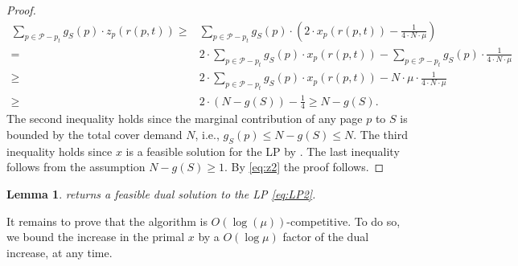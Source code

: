 \documentclass[11pt]{article}
\newcommand{\comment}[1]{}
\newcommand{\cP}{{\mathcal{P}}}
\newtheorem{lemma}[thm]{Lemma}
\begin{document}
{\begin{proof}
\begin{equation}
	\label{eq:z2}
	\begin{aligned}
		 \sum_{p \in \cP-p_t} g_S(p) \cdot z_p(r(p,t))
		\geq{} &   \sum_{p \in \cP-p_t} g_S(p) \cdot \left( 2 \cdot x_p(r(p,t))-\frac{1}{4 \cdot N \cdot \mu} \right)\\
		={} & 2 \cdot \sum_{p \in \cP-p_t} g_S(p) \cdot x_p(r(p,t))-\sum_{p \in \cP-p_t} g_S(p) \cdot \frac{1}{4 \cdot N \cdot \mu} \\
		\geq{} & 2 \cdot \sum_{p \in \cP-p_t} g_S(p) \cdot x_p(r(p,t))-N \cdot \mu \cdot \frac{1}{4 \cdot N \cdot \mu} \\
			\geq{} & 2 \cdot \left(N-g(S)\right)-\frac{1}{4} 
				\geq N-g(S). 
	\end{aligned}
\end{equation}
The second inequality holds since the marginal contribution of any page $p$ to $S$ is bounded by the total cover demand $N$, i.e., $g_S(p) \leq N-g(S) \leq N$. The third inequality holds since $x$ is a feasible solution for the LP by .   The last inequality follows from the assumption $N-g(S) \geq 1$. By \eqref{eq:z2} the proof follows. 
\end{proof}
}


	\begin{lemma}
	\label{lem:FFeasible}
	 returns a feasible dual solution to the \textnormal{LP} \eqref{eq:LP2}. 
\end{lemma}

\comment{
\begin{proof}
To prove that the dual $y$ is also feasible, consider some $p \in \cP$ and $j \in [n_p]$. By the update rate of $x_p(j)$ in \Cref{step:fx} it follows that 
		\begin{equation}
		\label{eq:FromSAP}
		\frac{1}{\mu} \cdot \left(     \exp \left(  \frac{\ln (\mu+1)}{c(p)} \cdot Y_p(j)\right)-1\right) = x_p(j) \leq 1.
	\end{equation} 
	The inequality holds since $Y_p(j)$ does not increase in time $t$ if $p$ is already fully evicted at this time by \Cref{step:InWhile}; that is, once $x_p(r(p,t)) = 1$ it holds that $Q$ is no longer minimal and the algorithm chooses a new minimal set $Q'$ that includes $p$. Thus, by simplifying the expression in \eqref{eq:FromSAP} it holds that 
	$$\exp \left( \frac{\ln (\mu+1)}{c(p)} \cdot Y_p(j) \right) \leq \mu+1.$$
	by taking logarithms from both sides $Y_p(j) \leq c(p)$. Hence, $y$ is a feasible dual solution. 
\end{proof}
}
It remains to prove that the algorithm is $O(\log (\mu))$-competitive. To do so, we bound the increase in the primal $x$ by a $O(\log \mu)$ factor of the dual increase, at any time. 
\end{document}
